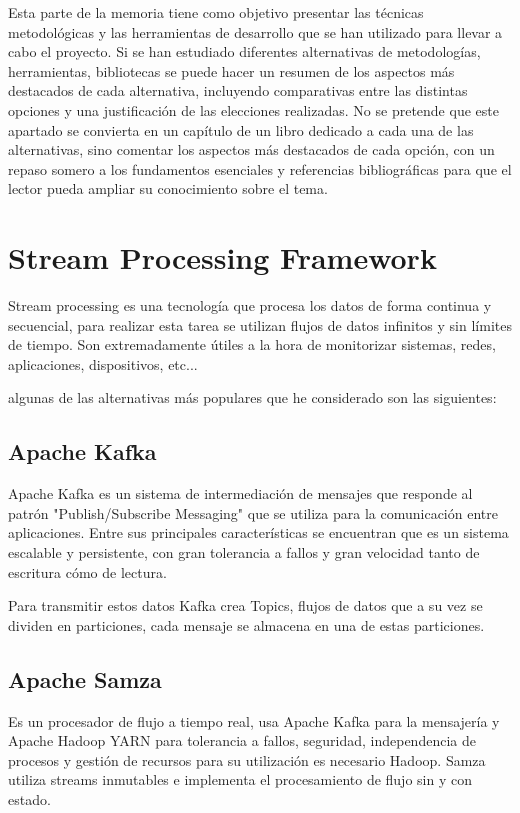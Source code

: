 
Esta parte de la memoria tiene como objetivo presentar las técnicas metodológicas y las herramientas de desarrollo que se han utilizado para llevar a cabo el proyecto. Si se han estudiado diferentes alternativas de metodologías, herramientas, bibliotecas se puede hacer un resumen de los aspectos más destacados de cada alternativa, incluyendo comparativas entre las distintas opciones y una justificación de las elecciones realizadas. 
No se pretende que este apartado se convierta en un capítulo de un libro dedicado a cada una de las alternativas, sino comentar los aspectos más destacados de cada opción, con un repaso somero a los fundamentos esenciales y referencias bibliográficas para que el lector pueda ampliar su conocimiento sobre el tema.


\section{Stream Processing Framework}

Stream processing es una tecnología que procesa los datos de forma continua y secuencial, para realizar esta tarea se utilizan flujos de datos infinitos y sin límites de tiempo. Son extremadamente útiles a la hora de monitorizar sistemas, redes, aplicaciones, dispositivos, etc... 

algunas de las alternativas más populares que he considerado son las siguientes:


\subsection{Apache Kafka}

Apache Kafka es un sistema de intermediación de mensajes que responde al patrón "Publish/Subscribe Messaging" que se utiliza para la comunicación entre aplicaciones. Entre sus principales características se encuentran que es un sistema escalable y persistente, con gran tolerancia a fallos y gran velocidad tanto de escritura cómo de lectura.

Para transmitir estos datos Kafka crea Topics, flujos de datos que a su vez se dividen en particiones, cada mensaje se almacena en una de estas particiones.

\subsection{Apache Samza}
Es un procesador de flujo a tiempo real, usa Apache Kafka para la mensajería y Apache Hadoop YARN para tolerancia a fallos, seguridad, independencia de procesos y gestión de recursos para su utilización es necesario Hadoop. Samza utiliza streams inmutables e implementa el procesamiento de flujo sin y con estado.  

